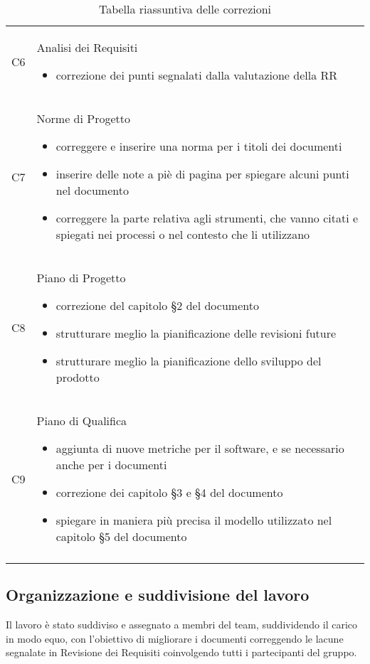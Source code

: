 \begin{center}
\begin{longtable}{  p{3cm} p{11.2cm}  }
				\\
				C6 & 		Analisi dei Requisiti
								\begin{itemize}
									\item correzione dei punti segnalati dalla valutazione della RR
								\end{itemize}
				\\
				C7 & 		Norme di Progetto
								\begin{itemize}
									\item correggere e inserire una norma per i titoli dei documenti
									\item inserire delle note a piè di pagina per spiegare alcuni punti nel documento
									\item correggere la parte relativa agli strumenti, che vanno citati e spiegati nei processi o nel contesto che li utilizzano
								\end{itemize}
				\\
				C8 & 		Piano di Progetto
								\begin{itemize}
									\item correzione del capitolo §2 del documento
									\item strutturare meglio la pianificazione delle revisioni future
									\item strutturare meglio la pianificazione dello sviluppo del prodotto
								\end{itemize}
				\\
				C9 & 		Piano di Qualifica
								\begin{itemize}
									\item aggiunta di nuove metriche per il software, e se necessario anche per i documenti
									\item correzione dei capitolo §3 e §4 del documento
									\item spiegare in maniera più precisa il modello utilizzato nel capitolo §5 del documento
								\end{itemize}
				\\
				
				\rowcolor{white}
				\caption{Tabella riassuntiva delle correzioni}
				\label{sec:tabella_riassuntiva1}
			\end{longtable}	
		\end{center}
	
\clearpage
	\subsection{Organizzazione e suddivisione del lavoro}
	\label{sec:oganizzazione_lavoro}
	Il lavoro è stato suddiviso e assegnato a membri del team, suddividendo il carico in modo equo, con l'obiettivo di migliorare i documenti correggendo le lacune segnalate in Revisione dei Requisiti coinvolgendo tutti i partecipanti del gruppo.

